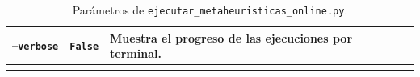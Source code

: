 \begin{longtable}[htbp]{|p{4.2cm}|p{2.3cm}|p{4.75cm}|}
    \texttt{--verbose}
                       & \texttt{False}
                       & Muestra el progreso de las ejecuciones por terminal.                                                  \\
    \hline
    \caption{Parámetros de \texttt{ejecutar\_metaheuristicas\_online.py}.}
    \label{tab:parametros_runner_online}
\end{longtable}

\endgroup








